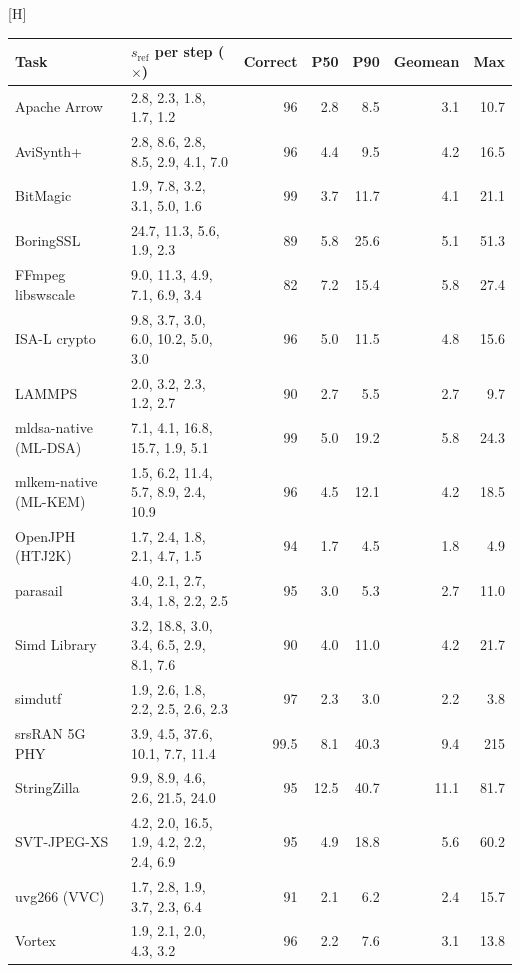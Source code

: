 \documentclass{article}
\makeatletter
\renewenvironment{table}
  {\setlength{\abovecaptionskip}{\@abovecaptionskip}%
   \setlength{\belowcaptionskip}{\@belowcaptionskip}%
   \@float{table}}
  {\end@float}
\makeatother
\begin{document}
\begin{table}[H]
  \centering
  \footnotesize
  \setlength{\tabcolsep}{4pt}
  \begin{tabular}{@{}>{\raggedright\arraybackslash}p{3.5cm} p{4.9cm} r r r r r@{}}
  \toprule
  Task & $s_{\mathrm{ref}}$ per step ($\times$) & Correct & P50 & P90 & Geomean & Max \\
  \midrule
  Apache Arrow & 2.8, 2.3, 1.8, 1.7, 1.2 & 96 & 2.8 & 8.5 & 3.1 & 10.7 \\
  AviSynth+ & 2.8, 8.6, 2.8, 8.5, 2.9, 4.1, 7.0 & 96 & 4.4 & 9.5 & 4.2 & 16.5 \\
  BitMagic & 1.9, 7.8, 3.2, 3.1, 5.0, 1.6 & 99 & 3.7 & 11.7 & 4.1 & 21.1 \\
  BoringSSL & 24.7, 11.3, 5.6, 1.9, 2.3 & 89 & 5.8 & 25.6 & 5.1 & 51.3 \\
  FFmpeg libswscale & 9.0, 11.3, 4.9, 7.1, 6.9, 3.4 & 82 & 7.2 & 15.4 & 5.8 & 27.4 \\
  ISA-L crypto & 9.8, 3.7, 3.0, 6.0, 10.2, 5.0, 3.0 & 96 & 5.0 & 11.5 & 4.8 & 15.6 \\
  LAMMPS & 2.0, 3.2, 2.3, 1.2, 2.7 & 90 & 2.7 & 5.5 & 2.7 & 9.7 \\
  mldsa-native (ML-DSA) & 7.1, 4.1, 16.8, 15.7, 1.9, 5.1 & 99 & 5.0 & 19.2 & 5.8 & 24.3 \\
  mlkem-native (ML-KEM) & 1.5, 6.2, 11.4, 5.7, 8.9, 2.4, 10.9 & 96 & 4.5 & 12.1 & 4.2 & 18.5 \\
  OpenJPH (HTJ2K) & 1.7, 2.4, 1.8, 2.1, 4.7, 1.5 & 94 & 1.7 & 4.5 & 1.8 & 4.9 \\
  parasail & 4.0, 2.1, 2.7, 3.4, 1.8, 2.2, 2.5 & 95 & 3.0 & 5.3 & 2.7 & 11.0 \\
  Simd Library & 3.2, 18.8, 3.0, 3.4, 6.5, 2.9, 8.1, 7.6 & 90 & 4.0 & 11.0 & 4.2 & 21.7 \\
  simdutf & 1.9, 2.6, 1.8, 2.2, 2.5, 2.6, 2.3 & 97 & 2.3 & 3.0 & 2.2 & 3.8 \\
  srsRAN 5G PHY & 3.9, 4.5, 37.6, 10.1, 7.7, 11.4 & 99.5 & 8.1 & 40.3 & 9.4 & 215 \\
  StringZilla & 9.9, 8.9, 4.6, 2.6, 21.5, 24.0 & 95 & 12.5 & 40.7 & 11.1 & 81.7 \\
  SVT-JPEG-XS & 4.2, 2.0, 16.5, 1.9, 4.2, 2.2, 2.4, 6.9 & 95 & 4.9 & 18.8 & 5.6 & 60.2 \\
  uvg266 (VVC) & 1.7, 2.8, 1.9, 3.7, 2.3, 6.4 & 91 & 2.1 & 6.2 & 2.4 & 15.7 \\
  Vortex & 1.9, 2.1, 2.0, 4.3, 3.2 & 96 & 2.2 & 7.6 & 3.1 & 13.8 \\
  \bottomrule
  \end{tabular}
  \caption{Raw optimization speedups by task. $s_{\mathrm{ref}}$, the speedup
    of the reference solution, is listed per step, in step order. Correct is the fraction of step records that pass the
    correctness gate (\%); P50, P90, geometric mean, and maximum speedups
    ($\times$) are computed over correct records.}
  \label{tab:speedups}
\end{table}
\end{document}
